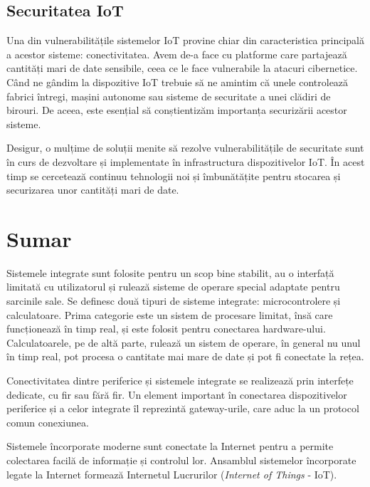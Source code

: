 \subsection{Securitatea IoT}
\label{sec:embed:iot:security}

Una din vulnerabilitățile sistemelor IoT provine chiar din caracteristica principală a acestor sisteme: conectivitatea.
Avem de-a face cu platforme care partajează cantități mari de date sensibile, ceea ce le face vulnerabile la atacuri cibernetice.
Când ne gândim la dispozitive IoT trebuie să ne amintim că unele controlează fabrici întregi, mașini autonome sau sisteme de securitate a unei clădiri de birouri.
De aceea, este esențial să conștientizăm importanța securizării acestor sisteme.

Desigur, o mulțime de soluții menite să rezolve vulnerabilitățile de securitate sunt în curs de dezvoltare și implementate în infrastructura dispozitivelor IoT.
 În acest timp se cercetează continuu tehnologii noi și îmbunătățite pentru stocarea și securizarea unor cantități mari de date.

\section{Sumar}
\label{sec:embed:summary}

Sistemele integrate sunt folosite pentru un scop bine stabilit, au o interfață limitată cu utilizatorul și rulează sisteme de operare special adaptate pentru sarcinile sale.
Se definesc două tipuri de sisteme integrate: microcontrolere și calculatoare.
Prima categorie este un sistem de procesare limitat, însă care funcționează în timp real, și este folosit pentru conectarea hardware-ului.
 Calculatoarele, pe de altă parte, rulează un sistem de operare, în general nu unul în timp real, pot procesa o cantitate mai mare de date și pot fi conectate la rețea.

Conectivitatea dintre periferice și sistemele integrate se realizează prin interfețe dedicate, cu fir sau fără fir.
 Un element important în conectarea dispozitivelor periferice și a celor integrate îl reprezintă gateway-urile, care aduc la un protocol comun conexiunea.

Sistemele încorporate moderne sunt conectate la Internet pentru a permite colectarea facilă de informație și controlul lor.
 Ansamblul sistemelor încorporate legate la Internet formează Internetul Lucrurilor (\textit{Internet of Things} - IoT).
